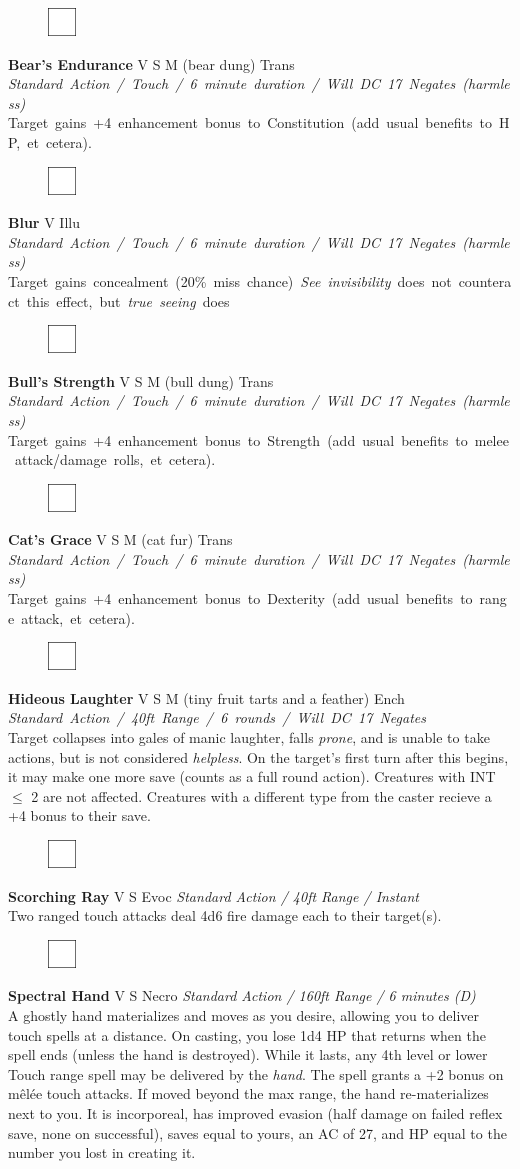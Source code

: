 \documentclass[letterpaper]{article}
\newcommand{\spell}[7]{
\begin{figure}
\vspace{-13pt}
\ifstrequal{#2}{Full}{  \includegraphics[width=2em]{Checkbox-Full}}{
\ifstrequal{#2}{Scroll}{\includegraphics[width=2em]{Checkbox-S}}{
                        \includegraphics[width=2em]{Checkbox}}}
\ifstrequal{#7}{}{\vspace{-1em}}{\vspace{#7}}
\end{figure}
\noindent \textbf{#1} #3 {
    \ifstrequal{#4}{Conj}{\color{Plum}Conj}{%
    \ifstrequal{#4}{Divin}{\color{YellowOrange}Divin}{%
    \ifstrequal{#4}{Ench}{\color{VioletRed}Ench}{%
    \ifstrequal{#4}{Trans}{\color{LimeGreen}Trans}{%
    \ifstrequal{#4}{Evoc}{\color{RedOrange}Evoc}{%
    \ifstrequal{#4}{Illu}{\color{ProcessBlue}Illu}{%
    \ifstrequal{#4}{Abjur}{\color{CadetBlue}Abjur}{%
    \ifstrequal{#4}{Necro}{\color{Red}Necro}{%
}}}}}}}}}
{\footnotesize \emph{#5}} \\
#6
}
\begin{document}
\spell{Bear's Endurance}{}{V S M (bear dung)}{Trans}{\mbox{Standard Action / Touch / 6 minute duration / Will DC 17 Negates (harmless)}} {%
\mbox{Target gains +4 enhancement bonus to Constitution (add usual benefits to HP, et cetera).} }{}\\[-1em] %

\spell{Blur}{}{V}{Illu}{\mbox{Standard Action / Touch / 6 minute duration / Will DC 17 Negates (harmless)}}{%
\mbox{Target gains concealment (20\% miss chance) \emph{See invisibility} does not counteract this effect, but \emph{true seeing} does} }{}\\[-1em] %

\spell{Bull's Strength}{}{V S M (bull dung)}{Trans}{\mbox{Standard Action / Touch / 6 minute duration / Will DC 17 Negates (harmless)}}{%
\mbox{Target gains +4 enhancement bonus to Strength (add usual benefits to melee attack/damage rolls, et cetera).} }{}\\[-1em] %

\spell{Cat's Grace}{}{V S M (cat fur)}{Trans}{\mbox{Standard Action / Touch / 6 minute duration / Will DC 17 Negates (harmless)}}{%
\mbox{Target gains +4 enhancement bonus to Dexterity (add usual benefits to range attack, et cetera).} }{}\\[-1em] %

\spell{Hideous Laughter}{}{V S M (tiny fruit tarts and a feather)}{Ench}{\mbox{Standard Action / 40ft Range / 6 rounds / Will DC 17 Negates }}{%
Target collapses into gales of manic laughter, falls \emph{prone}, and is unable to take actions, but is not considered \emph{helpless}. On the target's first turn after this begins, it may make one more save (counts as a full round action).  Creatures with INT $\leq$ 2 are not affected.  Creatures with a different type from the caster recieve a +4 bonus to their save.}{0em} %

\spell{Scorching Ray}{}{V S}{Evoc}{Standard Action / 40ft Range / Instant}{%
Two ranged touch attacks deal 4d6 fire damage each to their target(s).}{}\\[-1em] %

\spell{Spectral Hand}{}{V S}{Necro}{\emph{Standard Action / 160ft Range / 6 minutes (D)}}{%
A ghostly hand materializes and moves as you desire, allowing you to deliver touch spells at a distance.  On casting, you lose 1d4 HP that returns when the spell ends (unless the hand is destroyed).  While it lasts, any 4th level or lower Touch range spell may be delivered by the \emph{hand}.  The spell grants a +2 bonus on m\^{e}l\'{e}e touch attacks. If moved beyond the max range, the hand re-materializes next to you.  It is incorporeal, has improved evasion (half damage on failed reflex save, none on successful), saves equal to yours, an AC of 27, and HP equal to the number you lost in creating it.}{2em}\\[-1em] %
\end{document}
